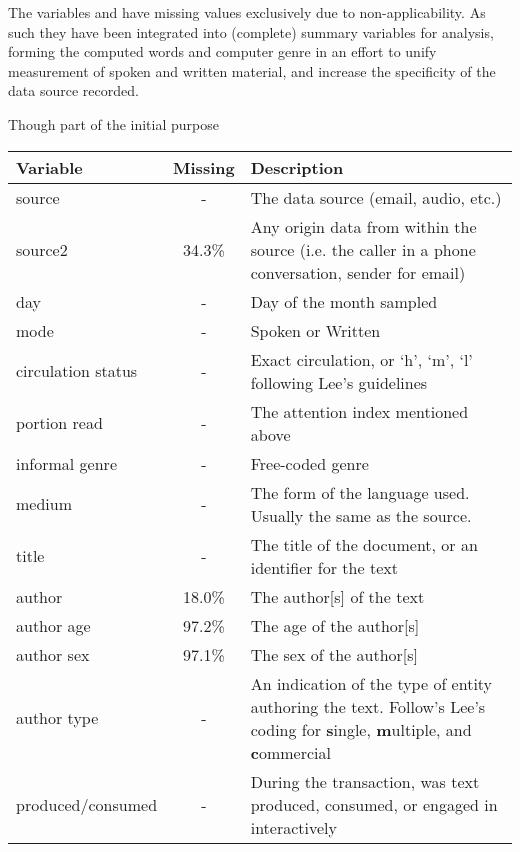 The variables  and  have missing values exclusively due to non-applicability.  As such they have been integrated into (complete) summary variables for analysis, forming the computed words and computer genre in an effort to unify measurement of spoken and written material, and increase the specificity of the data source recorded.

Though part of the initial purpose 


\begin{table}[hp]
\centering
    \begin{tabular}{ | l | c | p{7cm} |}
    \hline
    \textbf{Variable} & \textbf{Missing} & \textbf{Description} \\ \hline
   
    source              & - & The data source (email, audio, etc.) \\ \hline
    source2             & 34.3\% & Any origin data from within the source (i.e. the caller in a phone conversation, sender for email) \\ \hline
    day                 & - & Day of the month sampled \\ \hline
    mode                & - & Spoken or Written \\ \hline
    circulation status  & - & Exact circulation, or `h', `m', `l' following Lee's guidelines\\ \hline
    portion read        & - & The attention index mentioned above \\ \hline
    informal genre      & - & Free-coded genre \\ \hline
    medium              & - & The form of the language used.  Usually the same as the source. \\ \hline
    title               & - & The title of the document, or an identifier for the text \\ \hline
    author              & 18.0\% & The author[s] of the text\\ \hline
    author age          & 97.2\% & The age of the author[s] \\ \hline
    author sex          & 97.1\% & The sex of the author[s] \\ \hline
    author type         & - & An indication of the type of entity authoring the text.  Follow's Lee's coding for \textbf{s}ingle, \textbf{m}ultiple, and \textbf{c}ommercial\\ \hline
    produced/consumed   & - & During the transaction, was text produced, consumed, or engaged in interactively \\ \hline 

\end{tabular}
\end{table}
